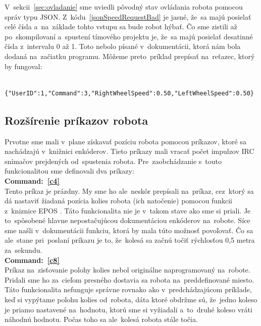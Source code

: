 V~sekcii~\ref{sec:ovladanie} sme uviedli pôvodný stav ovládania robota pomocou správ typu JSON.
Z~kódu~\ref{jsonSpeedRequestBad} je jasné, že~sa majú posielať celé čísla a~na~základe tohto vstupu sa bude robot hýbať. Čo sme zistili až
po~skompilovaní a~spustení tímového projektu je, že~sa majú posielať desatinné čísla z~intervalu 0 až 1. Toto nebolo písané
v~dokumentácii, ktorá nám bola dodaná na~začiatku programu. Môžeme preto~príklad prepísať na~reťazec, ktorý by fungoval:

	\label{jsonSpeedRequestGood}
	\begin{lstlisting}
			{"UserID":1,"Command":3,"RightWheelSpeed":0.50,"LeftWheelSpeed":0.50}
	\end{lstlisting}

\subsection{Rozšírenie príkazov robota}
\label{subsec:extendRobotCommands}

Prvotne sme mali v~plane získavať pozíciu robota pomocou príkazov, ktoré sa nachádzajú v~knižnici enkóderov.
Tieto príkazy mali vracať počet impulzov IRC snímačov prejdených od~spustenia robota.
Pre~zaobchádzanie s~touto funkcionalitou sme definovali dva príkazy:\\

\noindent \textbf{Command:~\ref{c4}} \\
\indent Tento príkaz je prázdny. My sme ho ale~neskôr prepísali na~príkaz, cez~ktorý sa dá nastaviť
žiadaná pozícia kolies robota (ich natočenie) pomocou funkcii z~kniznice EPOS \cite{EPOSdoc}.
Táto funkcionalita nie je v~takom stave ako sme si priali. Je to~spôsobené hlavne nepostačujúcou dokumentáciou enkóderov na~robote. Síce sme našli
v~dokumentácii funkciu, ktorá by mala túto možnosť povoľovať. Čo sa ale~stane pri~poslaní príkazu je to, že~kolesá sa začnú točiť rýchlosťou
0,5 metra za~sekundu.\\

\noindent \textbf{Command:~\ref{c8}} \\
\indent Príkaz na~zisťovanie polohy kolies nebol originálne naprogramovaný na~robote. Pridali sme ho za~cieľom presného dostavia sa robota
na~preddefinované miesto. Táto funkcionalita nefunguje správne rovnako ako v~predchádzajúcom príklade, keď si vypýtame polohu kolies od~robota,
dáta ktoré obdržme sú, že~jedno koleso je priamo nastavené na~hodnotu, ktorú sme si vyžiadali a~to~druhé koleso vráti náhodnú hodnotu.
Počas toho sa ale~kolesá robota stále točia.\\

